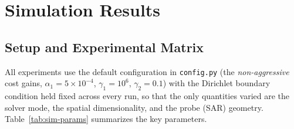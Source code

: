\chapter{Simulation Results}
\label{ch:results}

\section{Setup and Experimental Matrix}

All experiments use the default configuration in \texttt{config.py}
(the \emph{non-aggressive} cost gains, $\alpha_1 = 5\times10^{-4}$,
$\gamma_1 = 10^6$, $\gamma_2 = 0.1$) with the Dirichlet boundary
condition held fixed across every run, so that the only quantities
varied are the solver mode, the spatial dimensionality, and the probe
(SAR) geometry.
Table~\ref{tab:sim-params} summarizes the key parameters.

